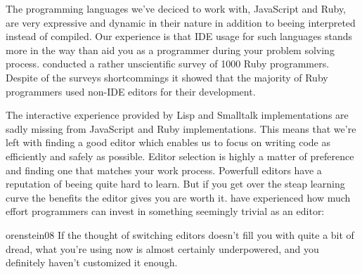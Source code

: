 The programming languages we've deciced to work with, JavaScript and Ruby, are
very expressive and dynamic in their nature in addition to beeing interpreted
instead of compiled. Our experience is that IDE usage for such languages
stands more in the way than aid you as a programmer during your problem
solving process.
\citet{bray07} conducted a rather unscientific survey of 1000 Ruby
programmers. Despite of the surveys shortcommings it showed that
the majority of Ruby programmers used non-IDE editors for their
development.

The interactive experience provided by Lisp and Smalltalk implementations are
sadly missing%
from JavaScript and Ruby implementations. This means that we're left with
finding a good editor which enables us to focus on writing code as efficiently
and safely as possible. Editor selection is highly a matter of preference and
finding one that matches your work process. Powerfull editors have a
reputation of beeing quite hard to learn. But if you get over the steap
learning curve the benefits the editor gives you are worth it.
\citeauthor{orenstein08} have experienced how much effort programmers can
invest in something seemingly trivial as an editor:

\begin{citequote}{orenstein08}
  If the thought of switching editors doesn't fill you with quite a bit of
  dread, what you're using now is almost certainly underpowered, and you
  definitely haven't customized it enough.
\end{citequote}


